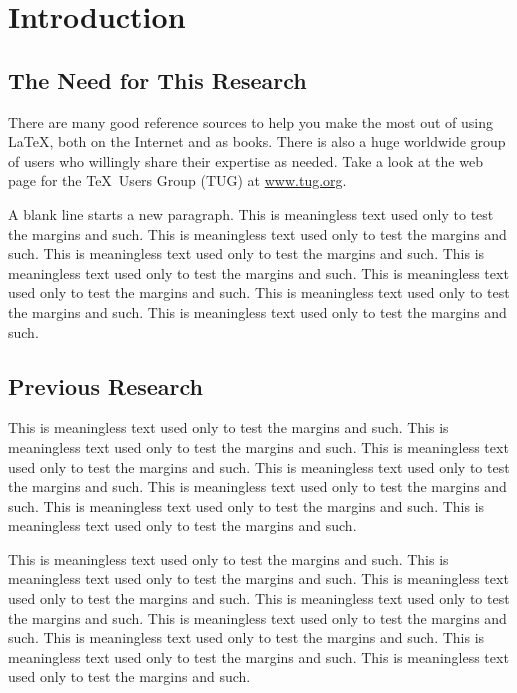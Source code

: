 
\chapter{Introduction}

\section{The Need for This Research}

There are many good reference sources to help you make the most out of using \LaTeX, both on the Internet and as books.  There is also a huge worldwide group of users who willingly share their expertise as needed.  Take a look at the web page for the \TeX\ Users Group (TUG) at \url{www.tug.org}.

A blank line starts a new paragraph. 
This is meaningless text used only to test the
margins and such. This is meaningless text used only to test the
margins and such. This is meaningless text used only to test the
margins and such. This is meaningless text used only to test the
margins and such. This is meaningless text used only to test the
margins and such. This is meaningless text used only to test the
margins and such. This is meaningless text used only to test the
margins and such.

\section{Previous Research}

This is meaningless text used only to test the margins and such.
This is meaningless text used only to test the margins and such.
This is meaningless text used only to test the margins and such.
This is meaningless text used only to test the margins and such.
This is meaningless text used only to test the margins and such.
This is meaningless text used only to test the margins and such.
This is meaningless text used only to test the margins and such.

This is meaningless text used only to test the margins and such.
This is meaningless text used only to test the margins and such.
This is meaningless text used only to test the margins and such.
This is meaningless text used only to test the margins and such.
This is meaningless text used only to test the margins and such.
This is meaningless text used only to test the margins and such.
This is meaningless text used only to test the margins and such.
This is meaningless text used only to test the margins and such.

